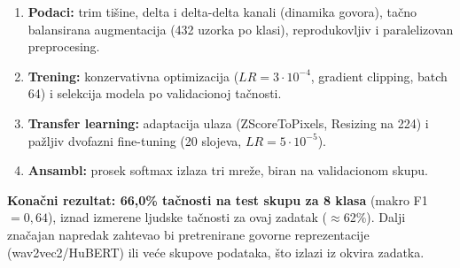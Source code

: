 \documentclass[12pt,a4paper]{article}
\begin{document}
\begin{enumerate}
  \item \textbf{Podaci:} trim tišine, delta i delta-delta kanali (dinamika
        govora), tačno balansirana augmentacija (432 uzorka po klasi),
        reprodukovljiv i paralelizovan preprocesing.
  \item \textbf{Trening:} konzervativna optimizacija ($LR = 3\cdot10^{-4}$,
        gradient clipping, batch 64) i selekcija modela po validacionoj
        tačnosti.
  \item \textbf{Transfer learning:} adaptacija ulaza (ZScoreToPixels,
        Resizing na 224) i pažljiv dvofazni fine-tuning (20 slojeva,
        $LR = 5\cdot10^{-5}$).
  \item \textbf{Ansambl:} prosek softmax izlaza tri mreže, biran na
        validacionom skupu.
\end{enumerate}

\textbf{Konačni rezultat: 66{,}0\% tačnosti na test skupu za 8 klasa}
(makro F1 $= 0{,}64$), iznad izmerene ljudske tačnosti za ovaj zadatak
($\approx$62\%). Dalji značajan napredak zahtevao bi pretrenirane govorne
reprezentacije (wav2vec2/HuBERT) ili veće skupove podataka, što izlazi iz
okvira zadatka.

%
%
\end{document}
